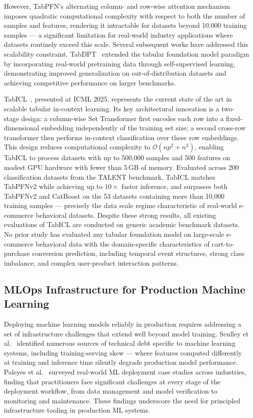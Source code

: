 \documentclass[conference]{IEEEtran}
\begin{document}
However, TabPFN's alternating column- and row-wise attention mechanism
imposes quadratic computational complexity with respect to both the
number of samples and features, rendering it intractable for datasets
beyond 10,000 training samples --- a significant limitation for
real-world industry applications where datasets routinely exceed this
scale. Several subsequent works have addressed this scalability
constraint. TabDPT~\cite{thomas2025tabdpt} extended the tabular
foundation model paradigm by incorporating real-world pretraining data
through self-supervised learning, demonstrating improved generalization
on out-of-distribution datasets and achieving competitive performance on
larger benchmarks.

TabICL~\cite{qu2025tabicl}, presented at ICML 2025, represents the
current state of the art in scalable tabular in-context learning. Its
key architectural innovation is a two-stage design: a column-wise Set
Transformer first encodes each row into a fixed-dimensional embedding
independently of the training set size; a second cross-row transformer
then performs in-context classification over these row embeddings. This
design reduces computational complexity to $\mathcal{O}(np^{2} + n^{2})$,
enabling TabICL to process datasets with up to 500,000 samples and 500
features on modest GPU hardware with fewer than 5\,GB of memory.
Evaluated across 200 classification datasets from the TALENT benchmark,
TabICL matches TabPFNv2 while achieving up to $10\times$ faster
inference, and surpasses both TabPFNv2 and CatBoost on the 53 datasets
containing more than 10,000 training samples --- precisely the data
scale regime characteristic of real-world e-commerce behavioral
datasets. Despite these strong results, all existing evaluations of
TabICL are conducted on generic academic benchmark datasets. No prior
study has evaluated any tabular foundation model on large-scale
e-commerce behavioral data with the domain-specific characteristics of
cart-to-purchase conversion prediction, including temporal event
structures, strong class imbalance, and complex user-product interaction
patterns.

\subsection{MLOps Infrastructure for Production Machine Learning}

Deploying machine learning models reliably in production requires addressing a set of infrastructure challenges that extend well beyond model training. Sculley et al.~\cite{sculley2015hidden} identified numerous sources of technical debt specific to machine learning systems,
including training-serving skew --- where features computed differently
at training and inference time silently degrade production model
performance. Paleyes et al.~\cite{paleyes2022challenges} surveyed
real-world ML deployment case studies across industries, finding that
practitioners face significant challenges at every stage of the
deployment workflow, from data management and model verification to
monitoring and maintenance. These findings underscore the need for
principled infrastructure tooling in production ML systems.
\end{document}
